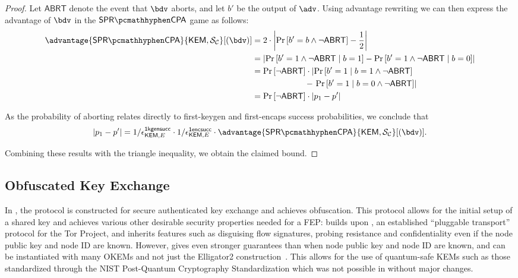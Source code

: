 \begin{proof}
    Let $\mathsf{ABRT}$ denote the event that $\bdv$ aborts, and let $b'$ be the output of $\adv$. Using advantage rewriting we can then express the advantage of $\bdv$ in the $\sprcpa$ game as follows:
    \begin{align*}
        \advantage{\sprcpa}{\KEM, \simulunif}[(\bdv)]
        &=
        2 \cdot \left|
            \Pr\left[b'=b \land \neg \mathsf{ABRT} \right] - \frac{1}{2}
        \right| \\
        &=
        \left|
            \Pr\left[b'=1 \land \neg \mathsf{ABRT} \mid b=1 \right] - \Pr\left[b'=1 \land \neg \mathsf{ABRT} \mid b=0 \right]
        \right| \\
        &=
        \Pr\left[\neg \mathsf{ABRT}\right] \cdot
        \left|
            \Pr\left[b'=1 \mid b=1 \land \neg \mathsf{ABRT} \right]
        \right.\\   
        &\qquad\qquad\qquad\  - \left.
            \Pr\left[b'=1 \mid b=0 \land \neg \mathsf{ABRT} \right]
        \right| \\
        &=
        \Pr\left[\neg \mathsf{ABRT}\right] \cdot
        \left|
            p_1 - p'
        \right|
    \end{align*}

    As the probability of aborting relates directly to first-keygen and first-encaps success probabilities, we conclude that
    \[
    \left| p_1 - p' \right| =
    1/\epsilon^\firstkeygensuccess_{\KEM,E}
    \cdot 1/\epsilon^\firstencapssuccess_{\KEM,E}
    \cdot \advantage{\sprcpa}{\KEM, \simulunif}[(\bdv)].
    \]
    
    Combining these results with the triangle inequality, we obtain the claimed bound.
\end{proof}

\subsection{Obfuscated Key Exchange}

In \cite{CCS:GunSteVei24}, the \pqobfs{} protocol is constructed for secure authenticated key exchange and achieves obfuscation. This protocol allows for the initial setup of a shared key and achieves various other desirable security properties needed for a FEP:
\pqobfs{} builds upon \obfsfour{} \cite{obfs4}, an established ``pluggable transport'' protocol for the Tor Project, and \pqobfs{} inherits features such as disguising flow signatures, probing resistance and confidentiality even if the node public key and node ID are known.
However, \pqobfs{} gives even stronger guarantees than \obfsfour{} when node public key and node ID are known, and can be instantiated with many OKEMs and not just the \textsf{Elligator2} construction~\cite{CCS:BHKL13}. This allows for the use of quantum-safe KEMs such as those standardized through the NIST Post-Quantum Cryptography Standardization \cite{nist-standardization} which was not possible in \obfsfour{} without major changes.

